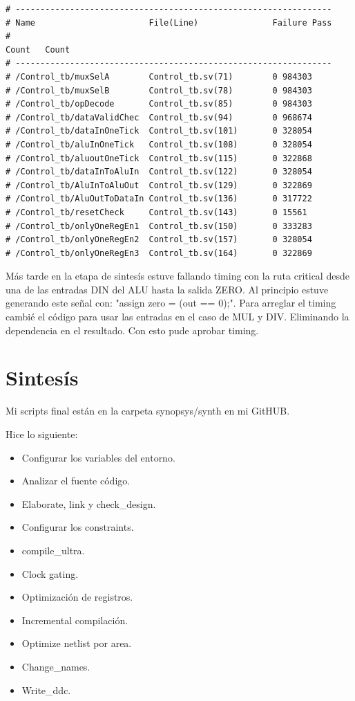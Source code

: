 \documentclass[a4paper]{article}
\begin{document}
\begin{verbatim}
# ----------------------------------------------------------------
# Name                       File(Line)               Failure Pass
#                                                                                                                           Count   Count
# ----------------------------------------------------------------
# /Control_tb/muxSelA        Control_tb.sv(71)        0 984303
# /Control_tb/muxSelB        Control_tb.sv(78)        0 984303
# /Control_tb/opDecode       Control_tb.sv(85)        0 984303
# /Control_tb/dataValidChec  Control_tb.sv(94)        0 968674
# /Control_tb/dataInOneTick  Control_tb.sv(101)       0 328054
# /Control_tb/aluInOneTick   Control_tb.sv(108)       0 328054
# /Control_tb/aluoutOneTick  Control_tb.sv(115)       0 322868
# /Control_tb/dataInToAluIn  Control_tb.sv(122)       0 328054
# /Control_tb/AluInToAluOut  Control_tb.sv(129)       0 322869
# /Control_tb/AluOutToDataIn Control_tb.sv(136)       0 317722
# /Control_tb/resetCheck     Control_tb.sv(143)       0 15561
# /Control_tb/onlyOneRegEn1  Control_tb.sv(150)       0 333283
# /Control_tb/onlyOneRegEn2  Control_tb.sv(157)       0 328054
# /Control_tb/onlyOneRegEn3  Control_tb.sv(164)       0 322869

\end{verbatim}

Más tarde en la etapa de sintesís estuve fallando timing con la ruta critical desde una de las entradas DIN del ALU hasta la salida ZERO. Al principio estuve generando este señal con: "assign zero = (out == 0);". Para arreglar el timing cambié el código para usar las entradas en el caso de MUL y DIV. Eliminando la dependencia en el resultado. Con esto pude aprobar timing.

\section{Sintesís}

Mi scripts final están en la carpeta synopsys/synth en mi GitHUB.

Hice lo siguiente:
\begin{itemize}[noitemsep]
    \item Configurar los variables del entorno.
    \item Analizar el fuente código.
    \item Elaborate, link y check\_design.
    \item Configurar los constraints.
    \item compile\_ultra.
    \item Clock gating.
    \item Optimización de registros.
    \item Incremental compilación.
    \item Optimize netlist por area.
    \item Change\_names.
    \item Write\_ddc.
\end{itemize}
\end{document}
